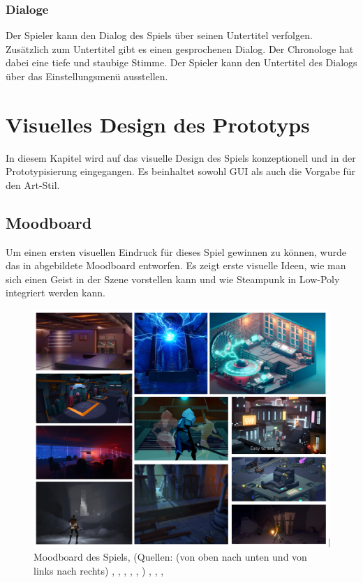 \subsection{Dialoge}
Der Spieler kann den Dialog des Spiels über seinen Untertitel verfolgen. Zusätzlich zum Untertitel gibt es einen gesprochenen Dialog. Der Chronologe hat dabei eine tiefe und staubige Stimme. Der Spieler kann den Untertitel des Dialogs über das Einstellungsmenü ausstellen. 

\chapter{Visuelles Design des Prototyps}\label{sec:design}
In diesem Kapitel wird auf das visuelle Design des Spiels konzeptionell und in der Prototypisierung eingegangen. Es beinhaltet sowohl \ac{GUI} als auch die Vorgabe für den Art-Stil.

\section{Moodboard}\label{sec:moodboard}
Um einen ersten visuellen Eindruck für dieses Spiel gewinnen  zu können, wurde das in  abgebildete Moodboard entworfen. Es zeigt erste visuelle Ideen, wie man sich einen Geist in der Szene vorstellen kann und wie Steampunk in Low-Poly integriert werden kann.

\begin{figure}[ht]
\centering
\includegraphics[width=0.8\linewidth]{content/pictures/Game_Atmo.jpg}
\caption{Moodboard des Spiels, (Quellen: (von oben nach unten und von links nach rechts) 
\cite{sathak_sci_2019}, 
\cite{saferdan_400_2013}, 
\cite{clever_plays_operation-tango-v1-694625jpg_nodate},
\cite{a44_ashen_nodate}, 
\cite{total_mayhem_games_2020_wwhtg_image-003png_nodate}, 
\cite{gamestar_necropolis_2016})
\cite{schick_stylized_2017}, 
\cite{cg_plane_dribbble_nodate}, 
\cite{sykoo_asset_2018}, 
\cite{bonfire_games_599d33f75cf0308cc12fc5d9870bffefd88debd1d42077e7ffe46975ee54a3afjpg_nodate}
\cite{forgotten_key_aer_nodate}}
\label{fig:moodboard}
\end{figure}


